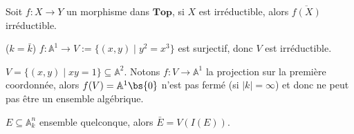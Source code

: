             \begin{exo}
                Soit $f : X \to Y$ un morphisme dans $\mathbf{Top}$, si $X$ est irréductible, alors $\overline{f(X)}$ irréductible.
            \end{exo}
            \begin{expl}
                ($k = \bar k$) $f : \mathbb{A}^1 \to V := \{(x,y) \mid y^2 = x^3\}$ est surjectif, donc $V$ est irréductible.
            \end{expl}
            \begin{expl}
                $V = \{(x,y) \mid xy = 1\} \subseteq \mathbb{A}^2$. Notons $f : V \to \mathbb{A}^1$ la projection sur la première coordonnée, alors $f(V) = \mathbb{A}^1 \bs \{0\}$ n'est pas fermé (si $|k| = \infty$) et donc ne peut pas être un ensemble algébrique.
            \end{expl}
            \begin{exo}
                $E \subseteq \mathbb{A}^n_k$ ensemble quelconque, alors $\bar E = V(I(E))$. 
            \end{exo}

